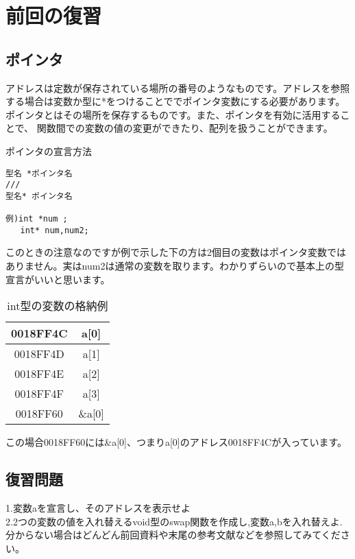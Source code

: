 ﻿\section{前回の復習}
\subsection{ポインタ}
アドレスは定数が保存されている場所の番号のようなものです。アドレスを参照する場合は変数か型に*をつけることででポインタ変数にする必要があります。
ポインタとはその場所を保存するものです。また、ポインタを有効に活用することで、
関数間での変数の値の変更ができたり、配列を扱うことができます。

\begin{itembox}{ポインタの宣言方法}
\begin{verbatim}
型名 *ポインタ名
///
型名* ポインタ名

例)int *num ;
   int* num,num2;
\end{verbatim}
\end{itembox}
このときの注意なのですが例で示した下の方は2個目の変数はポインタ変数ではありません。実はnum2は通常の変数を取ります。わかりずらいので基本上の型宣言がいいと思います。
\begin{table}[htb]
\begin{center}
\begin{tabular}{|c|c|}
\hline
0018FF4C & a[0]\\ \hline
0018FF4D & a[1]\\ \hline
0018FF4E & a[2]\\ \hline
0018FF4F & a[3]\\ \hline\hline\hline
0018FF60 & \&a[0]\\
\hline

\end{tabular}
\caption{ int型の変数の格納例}
\end{center}
\end{table}
この場合0018FF60には\&a[0]、つまりa[0]のアドレス0018FF4Cが入っています。
\subsection{復習問題}
\noindent
1.変数aを宣言し、そのアドレスを表示せよ\\
2.2つの変数の値を入れ替えるvoid型のswap関数を作成し,変数a,bを入れ替えよ.\\
分からない場合はどんどん前回資料や末尾の参考文献などを参照してみてください。


